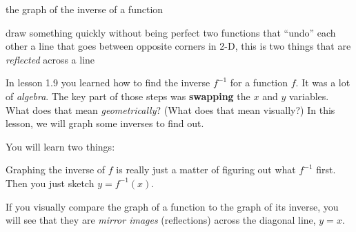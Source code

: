 \documentclass[fleqn,letterpaper,12pt,printwatermark=false]{memoir}
\begin{document}
\newcommand{\myClassName}{Pre-AP Algebra 2}
\newcommand{\myUnitNumber}{1}
\newcommand{\myUnitTitle}{Introduction to Functions}
\newcommand{\myLessonNumber}{10}
\newcommand{\myLessonTitle}{Sketching Inverses}



\pagestyle{myPagestyle}

\checkandfixthelayout
{}

\begin{myNotesHeader}
    \item {} the graph of the inverse of a function
\end{myNotesHeader}

\begin{myVocabulary}
        {
            draw something quickly without being perfect
        }
        {
            two functions that ``undo'' each other
        }
        {
            a line that goes between opposite corners
        }
        {
            in 2-D, this is 
            two things that are \emph{reflected} across a line
        }
\end{myVocabulary}

\begin{myLesson}
    In lesson 1.9 you learned how to find the inverse $f^{-1}$ 
    for a function $f$.
    It was a lot of \emph{algebra}.
    The key part of those steps was {\bfseries swapping} 
    the $x$ and $y$ variables. 
    What does that mean \emph{geometrically}? 
    (What does that mean visually?)
    In this lesson, we will graph some inverses to find out.

    You will learn two things:

    \begin{myLessonBox}
        Graphing the inverse of $f$ is really just a matter 
        of figuring out what $f^{-1}$ first. 
        Then you just sketch $y = f^{-1}(x)$.
    \end{myLessonBox}

    \begin{myLessonBox}
        If you visually compare the graph of a function
        to the graph of its inverse,
        you will see that they are \emph{mirror images} (reflections)
        across the diagonal line, $y=x$.
    \end{myLessonBox}
\end{myLesson}
\end{document}

